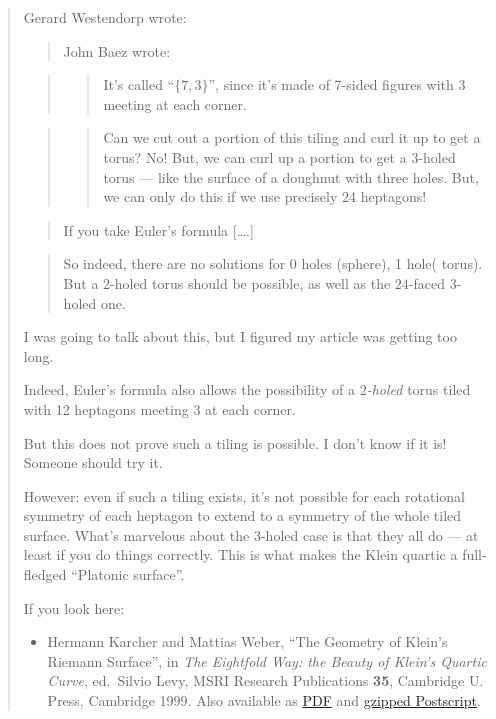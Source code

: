 \documentclass{article}
\def\tightlist{}
\begin{document}
\begin{quote}
Gerard Westendorp wrote:

\begin{quote}
John Baez wrote:
\end{quote}

\begin{quote}
\begin{quote}
It's called ``\(\{7,3\}\)'', since it's made of 7-sided figures with 3
meeting at each corner.
\end{quote}
\end{quote}

\begin{quote}
\begin{quote}
Can we cut out a portion of this tiling and curl it up to get a torus?
No! But, we can curl up a portion to get a \(3\)-holed torus --- like
the surface of a doughnut with three holes. But, we can only do this if
we use precisely 24 heptagons!
\end{quote}
\end{quote}

\begin{quote}
If you take Euler's formula {[}\ldots.{]}
\end{quote}

\begin{quote}
So indeed, there are no solutions for 0 holes (sphere), 1 hole( torus).
But a \(2\)-holed torus should be possible, as well as the \(24\)-faced
\(3\)-holed one.
\end{quote}

I was going to talk about this, but I figured my article was getting too
long.

Indeed, Euler's formula also allows the possibility of a
\emph{\(2\)-holed} torus tiled with 12 heptagons meeting 3 at each
corner.

But this does not prove such a tiling is possible. I don't know if it
is! Someone should try it.

However: even if such a tiling exists, it's not possible for each
rotational symmetry of each heptagon to extend to a symmetry of the
whole tiled surface. What's marvelous about the 3-holed case is that
they all do --- at least if you do things correctly. This is what makes
the Klein quartic a full-fledged ``Platonic surface''.

If you look here:

\begin{itemize}
\tightlist
\item
  Hermann Karcher and Mattias Weber, ``The Geometry of Klein's Riemann
  Surface'', in \emph{The Eightfold Way: the Beauty of Klein's Quartic
  Curve}, ed.~Silvio Levy, MSRI Research Publications \textbf{35},
  Cambridge U. Press, Cambridge 1999. Also available as
  \href{http://www.msri.org/publications/books/Book35/files/karcher.pdf}{PDF}
  and
  \href{http://www.msri.org/publications/books/Book35/files/karcher.ps.gz}{gzipped
  Postscript}.
\end{itemize}


\end{quote}
\end{document}
